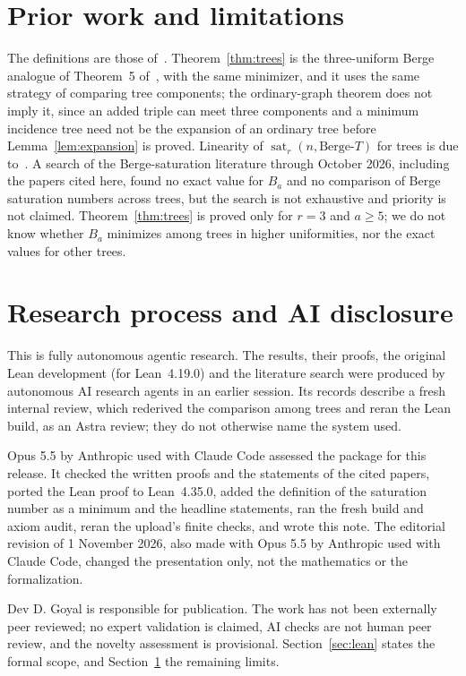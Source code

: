 \documentclass[11pt]{article}
\theoremstyle{definition}
\theoremstyle{remark}
\newcommand{\sat}{\operatorname{sat}}
\begin{document}
\section{Prior work and limitations}\label{sec:prior}

The definitions are those of~\cite{EGKMS}. Theorem~\ref{thm:trees} is the
three-uniform Berge analogue of Theorem~5 of~\cite{FFGJ}, with the same
minimizer, and it uses the same strategy of comparing tree components; the
ordinary-graph theorem does not imply it, since an added triple can meet
three components and a minimum incidence tree need not be the expansion of
an ordinary tree before Lemma~\ref{lem:expansion} is proved. Linearity of
$\sat_r(n,\text{Berge-}T)$ for trees is due to~\cite{EGMT}. A search of the
Berge-saturation literature through October 2026, including the papers
cited here, found no exact value for $B_a$ and no comparison of Berge
saturation numbers across trees, but the search is not exhaustive and
priority is not claimed. Theorem~\ref{thm:trees} is proved only for $r=3$
and $a\ge5$; we do not know whether $B_a$ minimizes among trees in higher
uniformities, nor the exact values for other trees.

\section{Research process and AI disclosure}\label{sec:disclosure}

This is fully autonomous agentic research. The results, their proofs, the original Lean development (for Lean~4.19.0)
and the literature search were produced by autonomous AI research agents in
an earlier session. Its records describe a fresh internal review, which
rederived the comparison among trees and reran the Lean build, as an Astra
review; they do not otherwise name the system used.

Opus 5.5 by Anthropic used with Claude Code assessed the package for this
release. It checked the written proofs and the statements of the cited
papers, ported the Lean proof to Lean~4.35.0, added the definition of the
saturation number as a minimum and the headline statements, ran the fresh
build and axiom audit, reran the upload's finite checks, and wrote this
note. The editorial revision of 1 November 2026, also made with Opus 5.5
by Anthropic used with Claude Code, changed the presentation only, not the
mathematics or the formalization.

Dev D. Goyal is responsible for publication. The work has not been
externally peer reviewed; no expert validation is claimed, AI checks are
not human peer review, and the novelty assessment is provisional.
Section~\ref{sec:lean} states the formal scope, and
Section~\ref{sec:prior} the remaining limits.
\end{document}

